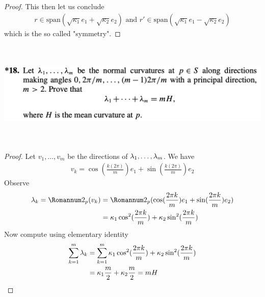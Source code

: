 \documentclass{report}
\begin{document}
\begin{proof}
This then let us conclude 
\begin{align*}
r\in \text{span}(\sqrt{\kappa_1}e_1+ \sqrt{\kappa_2}e_2)\text{ and }r' \in \text{span}(\sqrt{\kappa_1}e_1-\sqrt{\kappa_2}e_2  )
\end{align*}
which is the so called "symmetry". 
\end{proof}

\begin{question}{}{}
\includegraphics[height=5cm,width=18cm]{hw5q6}
\end{question}
\begin{proof}
Let $v_1,\dots,v_m$ be the directions of $\lambda _1,\dots ,\lambda _m$. We have 
\begin{align*}
v_k= \cos (\frac{k(2\pi )}{m})e_1 + \sin (\frac{k(2\pi)}{m})e_2
\end{align*}
Observe 
\begin{align*}
\ld_k =\Sec_p(v_k)&= \Sec_p ( \cos (\frac{2\pi k}{m})e_1 + \sin (\frac{2\pi k}{m})e_2)\\
&= \kappa_1 \cos^2 (\frac{2\pi k}{m})+ \kappa_2 \sin^2 (\frac{2\pi k}{m})
\end{align*}
Now compute using elementary identity
\begin{align*}
\sum_{k=1}^m \lambda_k &=\sum_{k=1}^m \kappa_1 \cos^2 (\frac{2\pi k}{m})+ \kappa_2 \sin^2 (\frac{2\pi k}{m})\\
&= \kappa_1 \frac{m}{2}+ \kappa_2 \frac{m}{2}=mH
\end{align*}
\end{proof}
\end{document}
